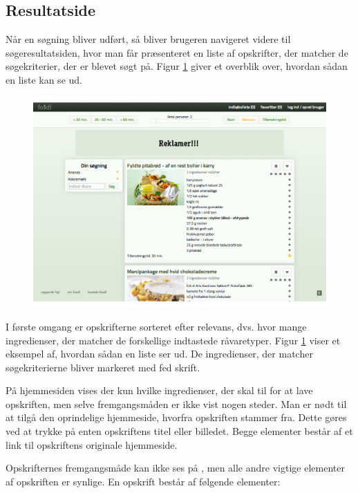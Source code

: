 \subsection{Resultatside}
\label{subsec:brug-resultat}

Når en søgning bliver udført, så bliver brugeren navigeret videre til søgeresultatsiden, hvor man får præsenteret en liste af opskrifter, der matcher de søgekriterier, der er blevet søgt på. Figur \ref{fig:overblik-resultat} giver et overblik over, hvordan sådan en liste kan se ud.

\begin{figure}[ht]
	\centering
	\includegraphics[scale=0.4]{billeder/foodl/thumbnails/soegeresultat.png}
	\label{fig:overblik-resultat}
\end{figure}

I første omgang er opskrifterne sorteret efter relevans, dvs. hvor mange ingredienser, der matcher de forskellige indtastede råvaretyper. Figur \ref{fig:overblik-resultat} viser et eksempel af, hvordan sådan en liste ser ud. De ingredienser, der matcher søgekriterierne bliver markeret med fed skrift. 

På hjemmesiden vises der kun hvilke ingredienser, der skal til for at lave opskriften, men selve fremgangsmåden er ikke vist nogen steder. Man er nødt til at tilgå den oprindelige hjemmeside, hvorfra opskriften stammer fra. Dette gøres ved at trykke på enten opskriftens titel eller billedet. Begge elementer består af et link til opskriftens originale hjemmeside. 

Opskrifternes fremgangsmåde kan ikke ses på \Foodl{}, men alle andre vigtige elementer af opskriften er synlige. En opskrift består af følgende elementer:

